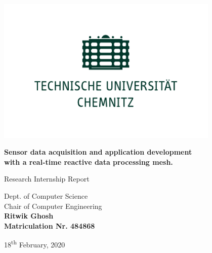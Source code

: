 \documentclass[a4paper, 12pt, oneside]{report}
\begin{document}
	\begin{titlepage}
		\begin{center}
		     
		    \includegraphics[width=0.8\textwidth]{TU_Chemnitz_positiv_gruen.pdf}
		    
		    \Huge
		    \textbf{Sensor data acquisition and application development\\
                    with a real-time reactive data processing mesh.}
	 
		    \vspace{0.5cm}
		    \LARGE
		    
		    \vspace{2cm}
	 
		    Research Internship Report
	 		
	 		\vspace {1cm}
		    
	 	 
		    \Large
		    Dept. of Computer Science\\
		    Chair of Computer Engineering\\
		    
			
			\vspace{2.6cm}
			\textbf{Ritwik Ghosh\\
			        Matriculation Nr. 484868}
			
			\vspace{0.8cm}

		    18\textsuperscript{th} February, 2020 
	 
		\end{center}
	\end{titlepage}

  
  \newpage
  
  
  \tableofcontents
  \listoffigures
  \printglossaries
  
\end{document}
